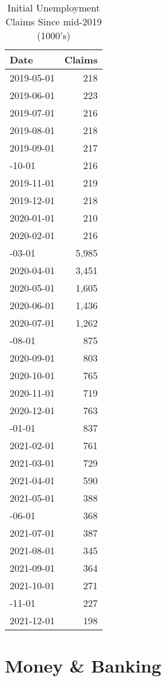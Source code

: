 \documentclass[
]{book}
\begin{document}
\begin{table}

\caption{\label{tab:initial}Initial Unemployment Claims Since mid-2019 
 (1000's)}
\centering
\begin{tabular}[t]{lr}
\toprule
Date & Claims\\
\midrule
2019-05-01 & 218\\
2019-06-01 & 223\\
2019-07-01 & 216\\
2019-08-01 & 218\\
2019-09-01 & 217\\
\addlinespace
2019-10-01 & 216\\
2019-11-01 & 219\\
2019-12-01 & 218\\
2020-01-01 & 210\\
2020-02-01 & 216\\
\addlinespace
2020-03-01 & 5,985\\
2020-04-01 & 3,451\\
2020-05-01 & 1,605\\
2020-06-01 & 1,436\\
2020-07-01 & 1,262\\
\addlinespace
2020-08-01 & 875\\
2020-09-01 & 803\\
2020-10-01 & 765\\
2020-11-01 & 719\\
2020-12-01 & 763\\
\addlinespace
2021-01-01 & 837\\
2021-02-01 & 761\\
2021-03-01 & 729\\
2021-04-01 & 590\\
2021-05-01 & 388\\
\addlinespace
2021-06-01 & 368\\
2021-07-01 & 387\\
2021-08-01 & 345\\
2021-09-01 & 364\\
2021-10-01 & 271\\
\addlinespace
2021-11-01 & 227\\
2021-12-01 & 198\\
\bottomrule
\end{tabular}
\end{table}

\hypertarget{money}{%
\chapter{Money \& Banking}\label{money}}
\end{document}
